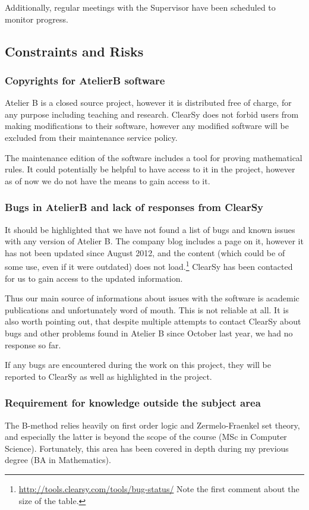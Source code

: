 \documentclass[11pt,journal]{IEEEtran}
\begin{document}
	Additionally, regular meetings with the Supervisor have been scheduled to monitor progress.  
	
	\subsection{Constraints and Risks}
	\subsubsection{Copyrights for AtelierB software}
	Atelier B is a closed source project, however it is distributed free of charge, for any purpose including teaching and research. ClearSy does not forbid users from making modifications to their software, however any modified software will be excluded from their maintenance service policy.
	
	The maintenance edition of the software includes a tool for proving mathematical rules. It could potentially be helpful to have access to it in the project, however as of now we do not have the means to gain access to it.
	
	\subsubsection{Bugs in AtelierB and lack of responses from ClearSy}
	It should be highlighted that we have not found a list of bugs and known issues with any version of Atelier B. The company blog includes a page on it, however it has not been updated since August 2012, and the content (which could be of some use, even if it were outdated) does not load.\footnote{\url{http://tools.clearsy.com/tools/bug-status/} Note the first comment about the size of the table.} ClearSy has been contacted for us to gain access to the updated information.
	
	Thus our main source of informations about issues with the software is academic publications and unfortunately word of mouth. This is not reliable at all. It is also worth pointing out, that despite multiple attempts to contact ClearSy about bugs and other problems found in Atelier B since October last year, we had no response so far.
	
	If any bugs are encountered during the work on this project, they will be reported to ClearSy as well as highlighted in the project. 
	
	\subsubsection{Requirement for knowledge outside the subject area}
	The B-method relies heavily on first order logic and Zermelo-Fraenkel set theory, and especially the latter is beyond the scope of the course (MSc in Computer Science). Fortunately, this area has been covered in depth during my previous degree (BA in Mathematics).
	
\end{document}
